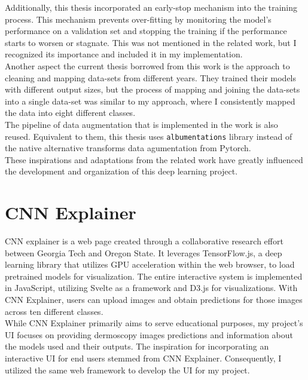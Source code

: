 Additionally, this thesis incorporated an early-stop mechanism into the training process. This mechanism prevents over-fitting by monitoring the model's performance on a validation set and stopping the training if the performance starts to worsen or stagnate. This was not mentioned in the related work, but I recognized its importance and included it in my implementation. \\

Another aspect the current thesis borrowed from this work is the approach to cleaning and mapping data-sets from different years. They trained their models with different output sizes, but the process of mapping and joining the data-sets into a single data-set was similar to my approach, where I consistently mapped the data into eight different classes. \\

The pipeline of data augmentation that is implemented in the work is also reused. Equivalent to them,
this thesis uses {\tt albumentations}\cite{Albumentations} library instead of the native alternative transforms data agumentation from Pytorch. \\

These inspirations and adaptations from the related work have greatly influenced the development and organization of this deep learning project.

\section{CNN Explainer}

CNN explainer is a web page created through a collaborative research effort between Georgia Tech and Oregon State\cite{CNNExplainer}. It leverages TensorFlow.js, a deep learning library that utilizes GPU acceleration within the web browser, to load pretrained models for visualization. The entire interactive system is implemented in JavaScript, utilizing Svelte as a framework and D3.js for visualizations. With CNN Explainer, users can upload images and obtain predictions for those images across ten different classes. \\

While CNN Explainer primarily aims to serve educational purposes, my project's UI focuses on providing dermoscopy images predictions and information about the models used and their outputs. The inspiration for incorporating an interactive UI for end users stemmed from CNN Explainer. Consequently, I utilized the same web framework to develop the UI for my project.
